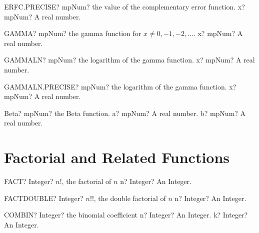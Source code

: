 \documentclass[12pt,a4paper,openany]{book}
\begin{document}
\begin{mpFunctionsExtract}
\mpWorksheetFunctionOneNotImplemented
{ERFC.PRECISE? mpNum? the value of the complementary error function.}
{x? mpNum? A real number.}
\end{mpFunctionsExtract}

\begin{mpFunctionsExtract}
\mpWorksheetFunctionOneNotImplemented
{GAMMA? mpNum? the gamma function for $x \neq 0, -1, -2,\ldots$.}
{x? mpNum? A real number.}
\end{mpFunctionsExtract}

\begin{mpFunctionsExtract}
\mpWorksheetFunctionOneNotImplemented
{GAMMALN? mpNum? the logarithm of the gamma function.}
{x? mpNum? A real number.}
\end{mpFunctionsExtract}

\begin{mpFunctionsExtract}
\mpWorksheetFunctionOneNotImplemented
{GAMMALN.PRECISE? mpNum? the logarithm of the gamma function.}
{x? mpNum? A real number.}
\end{mpFunctionsExtract}

\begin{mpFunctionsExtract}
\mpFunctionTwoNotImplemented
{Beta? mpNum? the Beta function.}
{a? mpNum? A real number.}
{b? mpNum? A real number.}
\end{mpFunctionsExtract}

\section{Factorial and Related Functions}

\begin{mpFunctionsExtract}
\mpWorksheetFunctionOneNotImplemented
{FACT? Integer?  $n!$, the factorial of $n$}
{n? Integer? An Integer.}
\end{mpFunctionsExtract}

\begin{mpFunctionsExtract}
\mpWorksheetFunctionOneNotImplemented
{FACTDOUBLE? Integer?  $n!!$, the double factorial of $n$}
{n? Integer? An Integer.}
\end{mpFunctionsExtract}

\begin{mpFunctionsExtract}
\mpWorksheetFunctionTwoNotImplemented
{COMBIN? Integer? the binomial coefficient}
{n? Integer? An Integer.}
{k? Integer? An Integer.}
\end{mpFunctionsExtract}
\end{document}

